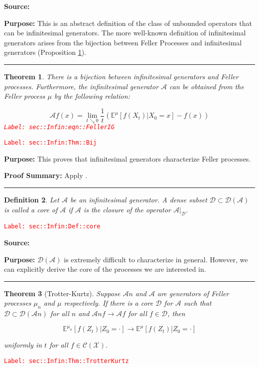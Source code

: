 \documentclass[12pt]{article}
\newcommand{\mb}{\mathbb}
\newcommand{\mc}{\mathcal}
\newcommand{\ra}{\rightarrow}
\newcommand{\tr}{\textcolor{red}}
\newcommand{\labe}[1]{\tr{\texttt{Label: #1}}}
\newcommand{\purpose}{\textbf{Purpose: }}
\newcommand{\pfsum}{\textbf{Proof Summary: }}
\newcommand{\lin}{\rule{\linewidth}{0.4 pt}}
\newcommand{\exmu}[2]{\mb{E}^{#1}\left[#2\right]}	%
\newcommand{\IG}{\mc{A}}						%
\newcommand{\core}{\mc{D}}						%
\newtheorem{thms}{Theorem}[section]
\newtheorem{defn}[thms]{Definition}
\begin{document}
\textbf{Source: }\cite[Definitions 2.1,2.7]{Lig85}

\purpose This is an abstract definition of the class of unbounded operators that can be infinitesimal generators. The more well-known definition of infinitesimal generators arises from the bijection between Feller Processes and infinitesimal generators (Proposition \ref{sec::Infin:Thm::Bij}).

\lin

\begin{thms}
There is a bijection between infinitesimal generators and Feller processes. Furthermore, the infinitesimal generator \(\IG{}\) can be obtained from the Feller process \(\mu\) by the following relation:

\begin{equation}
\mc{A}f(x) = \lim_{t\searrow 0} \frac{1}{t}\left(\mb{E}^\mu[f(X_t)|X_0=x] - f(x)\right)
\label{sec::Infin:eqn::FellerIG}
\end{equation}
\labe{sec::Infin:eqn::FellerIG}
\label{sec::Infin:Thm::Bij}
\end{thms}
\labe{sec::Infin:Thm::Bij}

\purpose This proves that infinitesimal generators characterize Feller processes.

\pfsum Apply \cite[Theorem 1.5,2.9]{Lig85}.

\lin

\begin{defn}
Let \(\IG{}\) be an infinitesimal generator. A dense subset \(\core\subset \core(\IG{})\) is called a core of \(\IG{}\) if \(\IG{}\) is the closure of the operator \(\IG{}|_\core\).
\label{sec::Infin:Def::core}
\end{defn}
\labe{sec::Infin:Def::core}

\textbf{Source: }\cite[Definition 2.11]{Lig85}

\purpose \(\core(\IG{})\) is extremely difficult to characterize in general. However, we can explicitly derive the core of the processes we are interested in.

\lin

\begin{thms}[Trotter-Kurtz]
Suppose \(\IG{n}\) and \(\IG{}\) are generators of Feller processes \(\mu_n\) and \(\mu\) respectively. If there is a core \(\core\) for \(\IG{}\) such that \(\core \subset \mc{D}(\IG{n})\) for all \(n\) and \(\IG{n} f \ra \IG{} f\) for all \(f \in \core\), then 

\[\exmu{\mu_n}{f(Z_t)|Z_0=\cdot} \ra \exmu{\mu}{f(Z_t)|Z_0=\cdot}\]

uniformly in \(t\) for all \(f \in \mc{C}(\mc{X})\).
\label{sec::Infin:Thm::TrotterKurtz}
\end{thms}
\labe{sec::Infin:Thm::TrotterKurtz}
\end{document}
